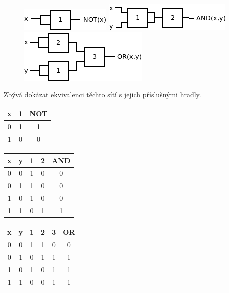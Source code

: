 \documentclass{scrartcl}
\begin{document}
\begin{figure}[!htb]
      \includegraphics[width=\linewidth]{nand_to_not}
    \endminipage\hfill
      \includegraphics[width=\linewidth]{nand_to_and}
    \endminipage\hfill
      \includegraphics[width=\linewidth]{nand_to_or}
    \endminipage
\end{figure}

Zbývá dokázat ekvivalenci těchto sítí s jejich příslušnými hradly.

\begin{center}
    \begin{tabular}{c | c | c}
        x & 1 & NOT \\ \hline
        0 & 1 & 1   \\
        1 & 0 & 0         
    \end{tabular}
    \hspace{10pt}
    \begin{tabular}{c | c | c | c | c}
        x & y & 1 & 2 & AND \\ \hline
        0 & 0 & 1 & 0 & 0   \\
        0 & 1 & 1 & 0 & 0   \\
        1 & 0 & 1 & 0 & 0   \\
        1 & 1 & 0 & 1 & 1   
    \end{tabular}
    \hspace{10pt}
    \begin{tabular}{c | c | c | c | c | c}
        x & y & 1 & 2 & 3 & OR  \\ \hline
        0 & 0 & 1 & 1 & 0 & 0   \\
        0 & 1 & 0 & 1 & 1 & 1   \\
        1 & 0 & 1 & 0 & 1 & 1   \\
        1 & 1 & 0 & 0 & 1 & 1
    \end{tabular}
\end{center}
\end{document}
